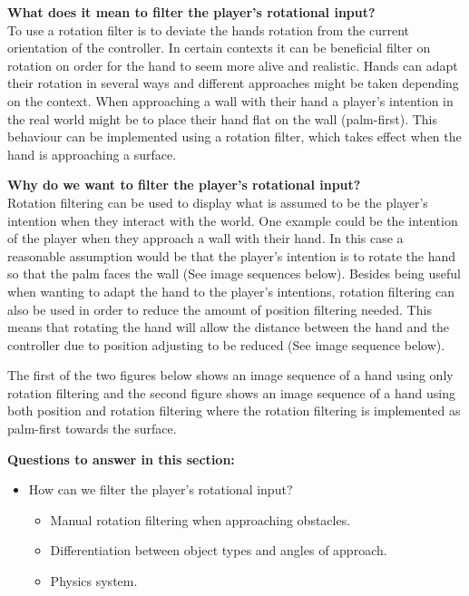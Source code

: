 \textbf{What does it mean to filter the player's rotational input?}\\
To use a rotation filter is to deviate the hands rotation from the current orientation of the controller. In certain contexts it can be beneficial filter on rotation on order for the hand to seem more alive and realistic. Hands can adapt their rotation in several ways and different approaches might be taken depending on the context. When approaching a wall with their hand a player's intention in the real world might be to place their hand flat on the wall (palm-first). This behaviour can be implemented using a rotation filter, which takes effect when the hand is approaching a surface.

\textbf{Why do we want to filter the player's rotational input?}\\
Rotation filtering can be used to display what is assumed to be the player's intention when they interact with the world. One example could be the intention of the player when they approach a wall with their hand. In this case a reasonable assumption would be that the player's intention is to rotate the hand so that the palm faces the wall (See image sequences below). Besides being useful when wanting to adapt the hand to the player's intentions, rotation filtering can also be used in order to reduce the amount of position filtering needed. This means that rotating the hand will allow the distance between the hand and the controller due to position adjusting to be reduced (See image sequence below).

The first of the two figures below shows an image sequence of a hand using only rotation filtering and the second figure shows an image sequence of a hand using both position and rotation filtering where the rotation filtering is implemented as palm-first towards the surface.


\textbf{Questions to answer in this section:}
\begin{itemize}
\item How can we filter the player's rotational input?
\begin{itemize}
\item Manual rotation filtering when approaching obstacles.
\item Differentiation between object types and angles of approach.
\item Physics system.
\end{itemize}
\end{itemize}

